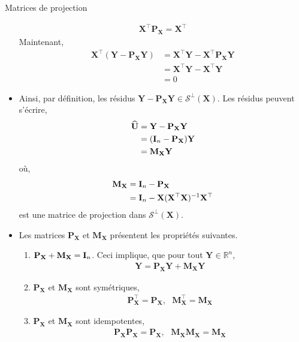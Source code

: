 \begin{frame}[allowframebreaks]{Matrices de projection}
\begin{itemize}
\begin{align*}
\mathbf{X}^\top\mathbf{P}_\mathbf{X} = \mathbf{X}^\top
\end{align*}
Maintenant,
\begin{align*}
\mathbf{X}^\top(\mathbf{Y} - \mathbf{P}_\mathbf{X}\mathbf{Y}) &= \mathbf{X}^\top\mathbf{Y}-\mathbf{X}^\top\mathbf{P}_\mathbf{X}\mathbf{Y}\\
& = \mathbf{X}^\top\mathbf{Y}-\mathbf{X}^\top\mathbf{Y}\\
&=0 
\end{align*}
\item Ainsi, par définition, les résidus $\mathbf{Y} - \mathbf{P}_\mathbf{X}\mathbf{Y}\in\mathcal{S}^\perp(\mathbf{X})$. Les résidus peuvent s'écrire,
\begin{align*}
\widehat{\mathbf{U}} &= \mathbf{Y}-\mathbf{P}_\mathbf{X}\mathbf{Y} \\
&= (\mathbf{I}_n - \mathbf{P}_\mathbf{X})\mathbf{Y}\\
& = \mathbf{M}_\mathbf{X}\mathbf{Y}
\end{align*}
où,
\begin{align*}
\mathbf{M}_\mathbf{X} &= \mathbf{I}_n - \mathbf{P}_\mathbf{X}\\
& = \mathbf{I}_n - \mathbf{X}(\mathbf{X}^\top\mathbf{X})^{-1}\mathbf{X}^\top
\end{align*}
est une matrice de projection dans $\mathcal{S}^\perp(\mathbf{X})$.\\
\item Les matrices $\mathbf{P}_\mathbf{X}$ et $\mathbf{M}_\mathbf{X}$ présentent les propriétés suivantes.
\begin{enumerate}
\item $\mathbf{P}_\mathbf{X}+\mathbf{M}_\mathbf{X} = \mathbf{I}_n$. 
 Ceci implique, que pour tout $\mathbf{Y}\in \mathbb{R}^n$,
\begin{align*}
\mathbf{Y} = \mathbf{P}_\mathbf{X}\mathbf{Y}+\mathbf{M}_\mathbf{X}\mathbf{Y}
\end{align*}
\item $\mathbf{P}_\mathbf{X}$ et $\mathbf{M}_\mathbf{X}$ sont symétriques,
\begin{align*}
\mathbf{P}_\mathbf{X}^\top = \mathbf{P}_\mathbf{X}, \ \ \ \mathbf{M}_\mathbf{X}^\top= \mathbf{M}_\mathbf{X}
\end{align*}
\item $\mathbf{P}_\mathbf{X}$ et $\mathbf{M}_\mathbf{X}$ sont idempotentes,
\begin{align*}
\mathbf{P}_\mathbf{X}\mathbf{P}_\mathbf{X} = \mathbf{P}_\mathbf{X}, \ \ \ \mathbf{M}_\mathbf{X} \mathbf{M}_\mathbf{X}= \mathbf{M}_\mathbf{X}

\end{align*}
\end{enumerate}
\end{itemize}
\end{frame}
